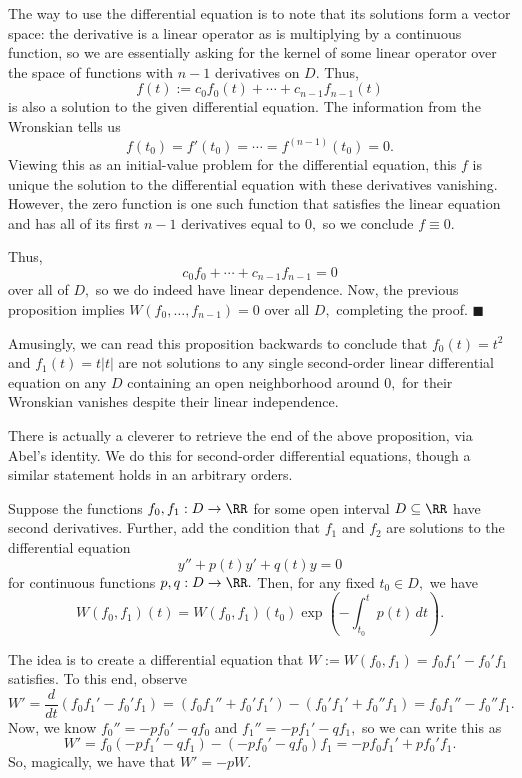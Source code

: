 The way to use the differential equation is to note that its solutions form a vector space: the derivative is a linear operator as is multiplying by a continuous function, so we are essentially asking for the kernel of some linear operator over the space of functions with $n-1$ derivatives on $D.$ Thus,
\[f(t):=c_0f_0(t)+\cdots+c_{n-1}f_{n-1}(t)\]
is also a solution to the given differential equation. The information from the Wronskian tells us
\[f(t_0)=f'(t_0)=\cdots=f^{(n-1)}(t_0)=0.\]
Viewing this as an initial-value problem for the differential equation, this $f$ is unique the solution to the differential equation with these derivatives vanishing. However, the zero function is one such function that satisfies the linear equation and has all of its first $n-1$ derivatives equal to $0,$ so we conclude $f\equiv 0.$

Thus,
\[c_0f_0+\cdots+c_{n-1}f_{n-1}=0\]
over all of $D,$ so we do indeed have linear dependence. Now, the previous proposition implies $W(f_0,\ldots,f_{n-1})=0$ over all $D,$ completing the proof. $\blacksquare$

Amusingly, we can read this proposition backwards to conclude that $f_0(t)=t^2$ and $f_1(t)=t|t|$ are not solutions to any single second-order linear differential equation on any $D$ containing an open neighborhood around $0,$ for their Wronskian vanishes despite their linear independence.

There is actually a cleverer to retrieve the end of the above proposition, via Abel's identity. We do this for second-order differential equations, though a similar statement holds in an arbitrary orders.
\begin{theorem}
    Suppose the functions $f_0,f_1:D\to\RR$ for some open interval $D\subseteq\RR$ have second derivatives. Further, add the condition that $f_1$ and $f_2$ are solutions to the differential equation
    \[y''+p(t)y'+q(t)y=0\]
    for continuous functions $p,q:D\to\RR.$ Then, for any fixed $t_0\in D,$ we have
    \[W(f_0,f_1)(t)=W(f_0,f_1)(t_0)\exp\left(-\int_{t_0}^tp(t)\,dt\right).\]
\end{theorem}
The idea is to create a differential equation that $W:=W(f_0,f_1)=f_0f_1'-f_0'f_1$ satisfies. To this end, observe
\[W'=\frac d{dt}(f_0f_1'-f_0'f_1)=(f_0f_1''+f_0'f_1')-(f_0'f_1'+f_0''f_1)=f_0f_1''-f_0''f_1.\]
Now, we know $f_0''=-pf_0'-qf_0$ and $f_1''=-pf_1'-qf_1,$ so we can write this as
\[W'=f_0(-pf_1'-qf_1)-(-pf_0'-qf_0)f_1=-pf_0f_1'+pf_0'f_1.\]
So, magically, we have that $W'=-pW.$

